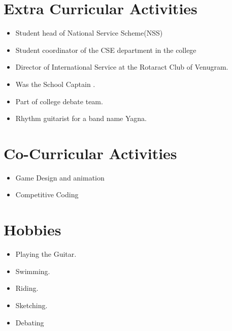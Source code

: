 \documentclass{article}
\begin{document}
		\section{Extra Curricular Activities}
			\begin{itemize}
				\item Student head of National Service Scheme(NSS)
				\item Student coordinator of the CSE department in the college
				\item Director of International Service at the Rotaract Club of Venugram.
				\item Was the School Captain .
				\item Part of college debate team.
				\item Rhythm guitarist for a band name Yagna.
			\end{itemize}
		\section{Co-Curricular Activities}
			\begin{itemize}
				\item Game Design and animation
				\item Competitive Coding 
			\end{itemize}
		\section{Hobbies}
		\begin{itemize}
			\item Playing the Guitar.
			\item Swimming.
			\item Riding.
			\item Sketching.
			\item Debating
		\end{itemize}
			
\end{document}
